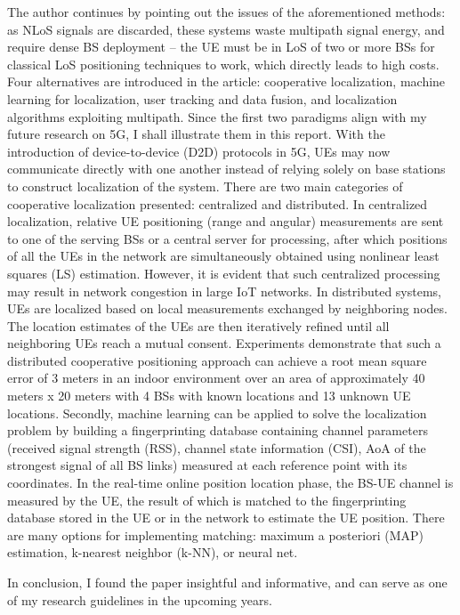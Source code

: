 \documentclass[12pt, a4paper, onside]{article}
\begin{document}
The author continues by pointing out the issues of the aforementioned methods: as NLoS signals are discarded, these systems waste multipath signal energy, and require dense BS deployment -- the UE must be in LoS of two or more BSs for classical LoS positioning techniques to work, which directly leads to high costs. Four alternatives are introduced in the article: cooperative localization, machine learning for localization, user tracking and data fusion, and localization algorithms exploiting multipath. Since the first two paradigms align with my future research on 5G, I shall illustrate them in this report. With the introduction of device-to-device (D2D) protocols in 5G, UEs may now communicate directly with one another instead of relying solely on base stations to construct localization of the system. There are two main categories of cooperative localization presented: centralized and distributed. In centralized localization, relative UE positioning (range and angular) measurements are sent to one of the serving BSs or a central server for processing, after which positions of all the UEs in the network are simultaneously obtained using nonlinear least squares (LS) estimation. However, it is evident that such centralized processing may result in network congestion in large IoT networks. In distributed systems, UEs are localized based on local measurements exchanged by neighboring nodes. The location estimates of the UEs are then iteratively refined until all neighboring UEs reach a mutual consent. Experiments demonstrate that such a distributed cooperative positioning approach can achieve a root mean square error of 3 meters in an indoor environment over an area of approximately 40 meters x 20 meters with 4 BSs with known locations and 13 unknown UE locations. Secondly, machine learning can be applied to solve the localization problem by building a fingerprinting database containing channel parameters (received signal strength (RSS), channel state information (CSI), AoA of the strongest signal of all BS links)  measured at each reference point with its coordinates. In the real-time online position location phase, the BS-UE channel is measured by the UE, the result of which is matched to the fingerprinting database stored in the UE or in the network to estimate the UE position. There are many options for implementing matching: maximum a posteriori (MAP) estimation, k-nearest neighbor (k-NN), or neural net.

In conclusion, I found the paper insightful and informative, and can serve as one of my research guidelines in the upcoming years.

\printbibliography
\end{document}
